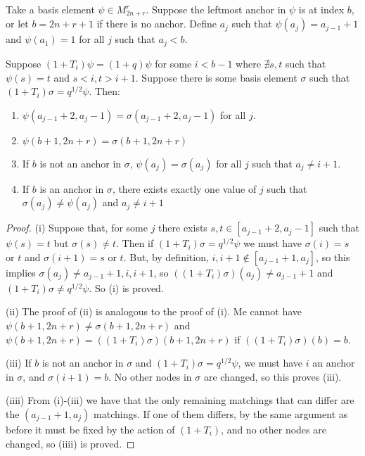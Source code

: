\documentclass{amsart}
\begin{document}
\vspace{5mm}
\begin{lemma}
	Take a basis element $\psi\in M_{2n+r}^r$. Suppose the leftmost anchor in $\psi$ is at index $b$, or let $b=2n+r+1$ if there is no anchor. Define $a_j$ such that $\psi(a_j)=a_{j-1}+1$ and $\psi(a_1)=1$ for all $j$ such that $a_j<b$. 
	
	Suppose $(1+T_i)\psi=(1+q)\psi$ for some $i<b-1$ where $\nexists s,t$ such that $\psi(s)=t$ and $s<i,t>i+1$. Suppose there is some basis element $\sigma$ such that $(1+T_i)\sigma=q^{1/2}\psi$. Then:
	\\
	
	\begin{enumerate}[label={(\roman*)}]
		\item  $\psi(a_{j-1}+2,a_j-1)=\sigma(a_{j-1}+2,a_j-1)$ for all $j$.
		
		\item $\psi(b+1,2n+r)=\sigma(b+1,2n+r)$
		
		\item If $b$ is not an anchor in $\sigma$, $\psi(a_j)=\sigma(a_j)$ for all $j$ such that $a_j\not=i+1$.
		
		\item If $b$ is an anchor in $\sigma$, there exists exactly one value of $j$ such that $\sigma(a_j)\not=\psi(a_j)$ and $a_j\not=i+1$
	\end{enumerate}
	\label{preimage under nothing}
\end{lemma}

\begin{proof}
	
	(i) Suppose that, for some $j$ there exists $s,t\in [a_{j-1}+2,a_j-1]$ such that $\psi(s)=t$ but $\sigma(s)\not=t$. Then if $(1+T_i)\sigma=q^{1/2}\psi$ we must have $\sigma(i)=s$ or $t$ and $\sigma(i+1)=s$ or $t$. But, by definition, $i,i+1\not\in[a_{j-1}+1,a_j]$, so this implies $\sigma(a_j)\not=a_{j-1}+1,i,i+1$, so $((1+T_i)\sigma)(a_j)\not=a_{j-1}+1$ and $(1+T_i)\sigma\not=q^{1/2}\psi$. So (i) is proved.
	
	\vspace{5mm}
	(ii) The proof of (ii) is analogous to the proof of (i). Me cannot have $\psi(b+1,2n+r)\not=\sigma(b+1,2n+r)$ and $\psi(b+1,2n+r)=((1+T_i)\sigma)(b+1,2n+r)$ if $((1+T_i)\sigma)(b)=b$.
	
	\vspace{5mm}
	(iii) If $b$ is not an anchor in $\sigma$ and $(1+T_i)\sigma=q^{1/2}\psi$, we must have $i$ an anchor in $\sigma$, and $\sigma(i+1)=b$. No other nodes in $\sigma$ are changed, so this proves (iii).
	
	\vspace{5mm}
	(iiii) From (i)-(iii) we have that the only remaining matchings that can differ are the $(a_{j-1}+1,a_j)$ matchings. If one of them differs, by the same argument as before it must be fixed by the action of $(1+T_i)$, and no other nodes are changed, so (iiii) is proved.
	
\end{proof}
\end{document}
